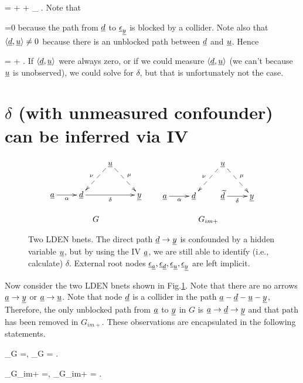 \beq
\rvy = \delta \rvd +
 \mu \rvu + \rveps_\rvy
\;.
\eeq
Note that

\beq
\av{\rvd, \rveps_\rvy}=0
\eeq
because the path from $\rvd$ to $\rveps_\rvy$
is blocked by a collider. Note also that
$\av{\rvd, \rvu}\neq 0$ because 
there is an unblocked path 
between $\rvd$ and $\rvu$.
Hence

\beq
\av{\rvd, \rvy} = \delta \av{\rvd, \rvd}
+ \mu\av{\rvd,\rvu}
\;.
\eeq
If $\av{\rvd,\rvu}$ were always zero,
or if we could measure $\av{\rvd,\rvu}$
(we can't because $\rvu$ is unobserved),
we could solve for $\delta$,
but that is unfortunately not the case.


\section{$\delta$
(with unmeasured confounder)
can be
inferred via IV}



\begin{figure}[h!]
$$
\begin{array}{ccc}
\xymatrix{
&&\rvu\ar@{-->}[dl]_\nu\ar@{-->}[dr]^\mu
\\
\rva\ar[r]_\alpha
&\rvd\ar[rr]_\delta
&&\rvy
}
&&
\xymatrix{
&&\rvu\ar@{-->}[dl]_\nu\ar@{-->}[dr]^\mu
\\
\rva\ar[r]_\alpha
&\rvd&
\rvtd\ar[r]_\delta
&\rvy}
\\
\\
G&&G_{im+}
\end{array}
$$
\caption{
Two LDEN bnets. The direct path $\rvd\rarrow\rvy$
is confounded by
a hidden variable $\rvu$, but
by using the IV $\rva$, we are still
able to 
identify (i.e., calculate)
$\delta$.
External root nodes $\rveps_\rva, \rveps_\rvd,
\rveps_\rvu, \rveps_\rvy$ are left implicit.
}
\label{fig-iv-G-im}
\end{figure}

Now consider the two LDEN bnets 
shown in Fig.\ref{fig-iv-G-im}.
Note that there are no arrows
$\rva\rarrow\rvy$
or 
$\rva\rarrow\rvu$. Note that
node $\rvd$ is a collider
in the path 
$\rva-\rvd-\rvu-\rvy$, 
Therefore,
the only unblocked path
from $\rva$ to 
$\rvy$ in $G$ 
is $\rva\rarrow\rvd\rarrow\rvy$
and that path has been
removed in $G_{im+}$. These
observations are 
encapsulated in the following statements.

\beq
\rvd\perp_{G} \rvy =, 
\;\; \rva\perp_{G} \rvy= 
\;.
\eeq

\beq
\rvd\perp_{G_{im+}} \rvy =, 
\;\; \rva\perp_{G_{im+}} \rvy= 
\;.
\eeq


